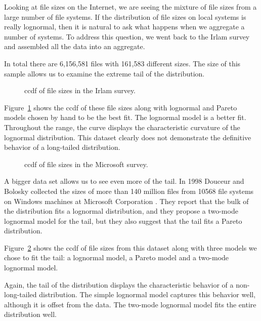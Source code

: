 \documentclass[10pt,twocolumn]{article}
\begin{document}

Looking at file sizes on the Internet, we are seeing
the mixture of file sizes from a large number
of file systems.  If the distribution of file sizes on
local systems is really lognormal, then it
is natural to ask what happens when we aggregate a number
of systems.  To address this question, we went back to the Irlam
survey and assembled all the data into an aggregate.

In total there are 6,156,581 files with 161,583 different sizes.  The
size of this sample allows us to examine the extreme tail of the
distribution.


\begin{figure}[tb]
\centerline{}
\caption{ccdf of file sizes in the Irlam survey.}
\label{fig.irlam}
\end{figure}

Figure~\ref{fig.irlam} shows the ccdf of these file sizes along
with lognormal and Pareto models chosen by hand to be the best
fit.  The lognormal model is a better fit.  Throughout the range,
the curve displays the characteristic curvature of the lognormal
distribution.  This dataset clearly does not demonstrate the
definitive behavior of a long-tailed distribution.

\begin{figure}[tb]
\centerline{}
\caption{ccdf of file sizes in the Microsoft survey.}
\label{fig.ms}
\end{figure}

A bigger data set allows us to see even more of the tail.  In 1998
Douceur and Bolosky collected the sizes of more than 140 million files
from 10568 file systems on Windows machines at Microsoft Corporation
\cite{DouceurBolosky99}.  They report that the bulk of the
distribution fits a lognormal distribution, and they propose a
two-mode lognormal model for the tail, but they also suggest that the
tail fits a Pareto distribution.

Figure~\ref{fig.ms} shows the ccdf
of file sizes from this dataset along with three models we chose to
fit the tail: a lognormal model, a Pareto model and a two-mode
lognormal model.

Again, the tail of the distribution displays the characteristic
behavior of a non-long-tailed distribution.  The simple
lognormal model captures this behavior well, although it is
offset from the data.  The two-mode lognormal model fits the
entire distribution well.
\end{document}
